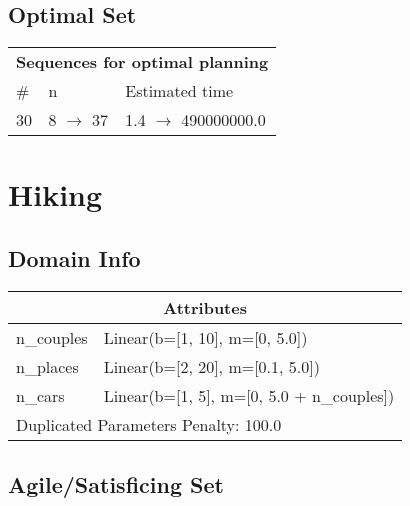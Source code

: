 \documentclass{article}
\begin{document}
                            \subsection*{Optimal Set}

                            \begin{center}
                            \begin{tabular}{l|l|l}
                            \multicolumn{3}{c}{\bf \large Sequences for optimal planning}\\
                            \# & n & Estimated time\\\midrule
                            30&8 $\rightarrow$ 37&1.4 $\rightarrow$ 490000000.0
                            \end{tabular}
                            \end{center}
                    \newpage \section{Hiking}
                    \subsection*{Domain Info}

                    \begin{center}
                    \begin{tabular}{p{}p{}}
                    \multicolumn{2}{c}{\bf \large Attributes}\\\midrule
                    n\_couples & Linear(b=[1, 10], m=[0, 5.0])\\
n\_places & Linear(b=[2, 20], m=[0.1, 5.0])\\
n\_cars & Linear(b=[1, 5], m=[0, 5.0 + n\_couples])
                    
                     \\\midrule
                    \multicolumn{2}{l}{Duplicated Parameters Penalty: 100.0}
                    \end{tabular}
                    \end{center}
                
                         \subsection*{Agile/Satisficing Set}
\end{document}
